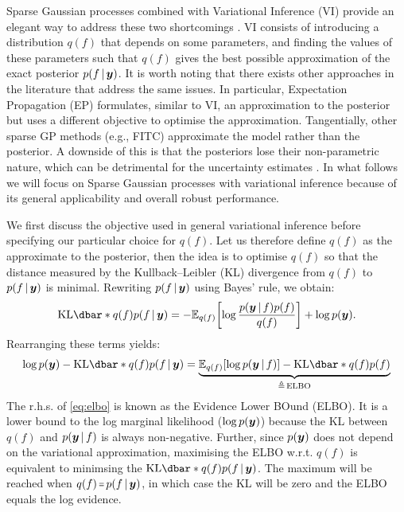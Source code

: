 Sparse Gaussian processes combined with Variational Inference (VI) provide an elegant way to address these two shortcomings \citep{titsias2009, hensman2013, hensman2015scalable}. VI consists of introducing a distribution $q(f)$ that depends on some parameters, and finding the values of these parameters such that $q(f)$ gives the best possible approximation of the exact posterior $p(f \,|\, \bm{y} )$. It is worth noting that there exists other approaches in the literature that address the same issues. In particular, Expectation Propagation (EP) \citep{minka2001expectation,bui2017unifying} formulates, similar to VI, an approximation to the posterior but uses a different objective to optimise the approximation. Tangentially, other sparse GP methods (e.g., FITC) \citep{Snelson05,quinonero2005unifying} approximate the model rather than the posterior. A downside of this is that the posteriors lose their non-parametric nature, which can be detrimental for the uncertainty estimates \citep{bauer2016understanding}. In what follows we will focus on Sparse Gaussian processes with variational inference because of its general applicability and overall robust performance.

We first discuss the objective used in general variational inference before specifying our particular choice for $q(f)$. Let us therefore define $q(f)$ as the approximate to the posterior, then the idea is to optimise $q(f)$ so that the distance measured by the Kullback–Leibler (KL) divergence from $q(f)$ to $p(f \,|\, \bm{y})$ is minimal. Rewriting $p(f \,|\, \bm{y})$ using Bayes' rule, we obtain:
\begin{equation}
  \KL{q(f)}{p(f \given \vy)} = -{\Exp{q(f)}{\log \frac{p(\vy \given f) p(f)}{q(f)}}} + \log p(\vy).
\end{equation}
Rearranging these terms yields:
\begin{equation}
  \label{eq:elbo}
  \log p(\vy) - \KL{q(f)}{p(f \given \vy)} = 
  \underbrace{\Exp{q(f)}{\log p(\vy \given f)} - \KL{q(f)}{p(f)}}_{\triangleq\,\textrm{ELBO}}
\end{equation}
The r.h.s. of \cref{eq:elbo} is known as the Evidence Lower BOund (ELBO). It is a lower bound to the log marginal likelihood ($\log p(\bm{y})$) because the KL between $q(f)$ and $p(\bm{y} \,|\, f)$ is always non-negative. Further, since $p(\bm{y})$ does not depend on the variational approximation, maximising the ELBO w.r.t. $q(f)$ is equivalent to minimsing the $\KL{q(f)}{p(f \given \vy)}$. The maximum will be reached when $q(f) \shorteq p(f \given \vy)$, in which case the KL will be zero and the ELBO equals the log evidence. 

